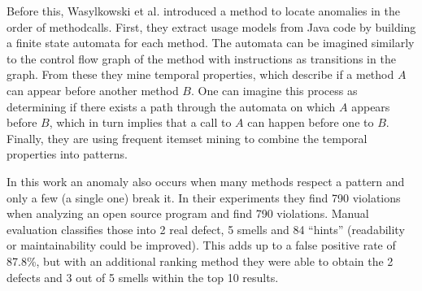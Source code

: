 
Before this, Wasylkowski et al. \cite{wasylkowski2007detecting} introduced a method to locate anomalies in the order of methodcalls.
First, they extract usage models from Java code by building a finite state automata for each method.
The automata can be imagined similarly to the control flow graph of the method with instructions as transitions in the graph.
From these they mine temporal properties, which describe if a method $A$ can appear before another method $B$.
One can imagine this process as determining if there exists a path through the automata on which $A$ appears before $B$, which in turn implies that a call to $A$ can happen before one to $B$.
Finally, they are using frequent itemset mining \cite{han2006data} to combine the temporal properties into patterns.

In this work an anomaly also occurs when many methods respect a pattern and only a few (a single one) break it.
In their experiments they find 790 violations when analyzing an open source program and find 790 violations.
Manual evaluation classifies those into 2 real defect, 5 smells and 84 ``hints'' (readability or maintainability could be improved).
This adds up to a false positive rate of 87.8\%, but with an additional ranking method they were able to obtain the 2 defects and 3 out of 5 smells within the top 10 results.

